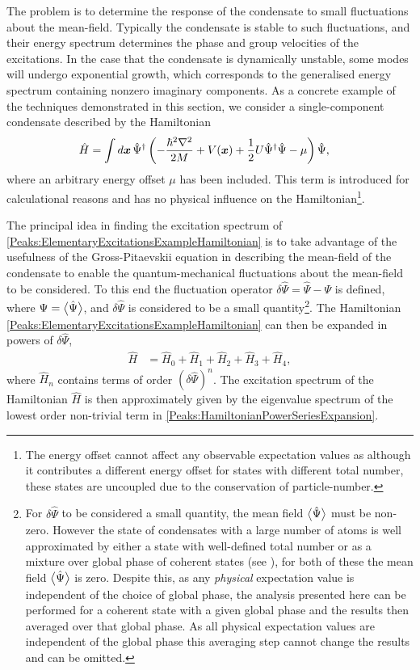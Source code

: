 The problem is to determine the response of the condensate to small fluctuations about the mean-field. Typically the condensate is stable to such fluctuations, and their energy spectrum determines the phase and group velocities of the excitations.  In the case that the condensate is dynamically unstable, some modes will undergo exponential growth, which corresponds to the generalised energy spectrum containing nonzero imaginary components. As a concrete example of the techniques demonstrated in this section, we consider a single-component condensate described by the Hamiltonian
\begin{align}
    \label{Peaks:ElementaryExcitationsExampleHamiltonian}
    \hat{H} &= \int d \vect{x}\, \hat{\Psi}^\dagger \left( -\frac{\hbar^2 \nabla^2}{2 M} + V(\vect{x}) + \frac{1}{2} U \hat{\Psi}^\dagger \hat{\Psi} - \mu \right) \hat{\Psi},
\end{align}
where an arbitrary energy offset $\mu$ has been included. This term is introduced for calculational reasons and has no physical influence on the Hamiltonian\footnote{The energy offset cannot affect any observable expectation values as although it contributes a different energy offset for states with different total number, these states are uncoupled due to the conservation of particle-number.}.

The principal idea in finding the excitation spectrum of \eqref{Peaks:ElementaryExcitationsExampleHamiltonian} is to take advantage of the usefulness of the Gross-Pitaevskii equation in describing the mean-field of the condensate to enable the quantum-mechanical fluctuations about the mean-field to be considered. To this end the fluctuation operator $\delta \hat{\Psi} = \hat{\Psi} - \Psi$ is defined, where $\Psi = {\big<\hat{\Psi}\big>}$, and $\delta \hat{\Psi}$ is considered to be a small quantity\footnote{For $\delta\hat{\Psi}$ to be considered a small quantity, the mean field ${\big<\hat{\Psi}\big>}$ must be non-zero. However the state of condensates with a large number of atoms is well approximated by either a state with well-defined total number or as a mixture over global phase of coherent states (see ), for both of these the mean field ${\big<\hat{\Psi}\big>}$ is zero. Despite this, as any \emph{physical} expectation value is independent of the choice of global phase, the analysis presented here can be performed for a coherent state with a given global phase and the results then averaged over that global phase. As all physical expectation values are independent of the global phase this averaging step cannot change the results and can be omitted.}. The Hamiltonian \eqref{Peaks:ElementaryExcitationsExampleHamiltonian} can then be expanded in powers of $\delta \hat{\Psi}$,
\begin{align}
    \label{Peaks:HamiltonianPowerSeriesExpansion}
    \hat{H} &= \hat{H}_0 + \hat{H}_1 + \hat{H}_2 + \hat{H}_3 + \hat{H}_4,
\end{align}
where $\hat{H}_n$ contains terms of order $(\delta\hat{\Psi})^n$. The excitation spectrum of the Hamiltonian $\hat{H}$ is then approximately given by the eigenvalue spectrum of the lowest order non-trivial term in \eqref{Peaks:HamiltonianPowerSeriesExpansion}.

